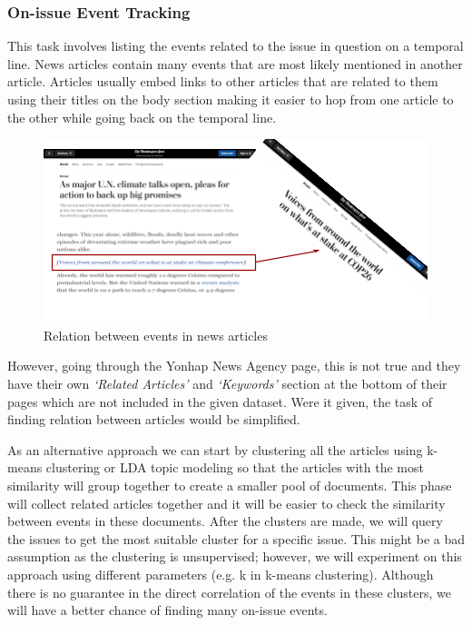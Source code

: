 \documentclass[sigconf,authorversion,nonacm]{acmart}
\begin{document}
\subsubsection{On-issue Event Tracking}
\label{sec:onissue}
This task involves listing the events related to the issue in question on a temporal line. News articles contain many events that are most likely mentioned in another article. Articles usually embed links to other articles that are related to them using their titles on the body section making it easier to hop from one article to the other while going back on the temporal line.

\begin{figure}[h]
    \centering
    \includegraphics[width=\linewidth]{img/rel.png}
    \caption{Relation between events in news articles}
\end{figure}

However, going through the Yonhap News Agency page, this is not true and they have their own \emph{`Related Articles'} and \emph{`Keywords'} section at the bottom of their pages which are not included in the given dataset. Were it given, the task of finding relation between articles would be simplified.

As an alternative approach we can start by clustering all the articles using k-means clustering or LDA topic modeling so that the articles with the most similarity will group together to create a smaller pool of documents. This phase will collect related articles together and it will be easier to check the similarity between events in these documents. After the clusters are made, we will query the issues to get the most suitable cluster for a specific issue. This might be a bad assumption as the clustering is unsupervised; however, we will experiment on this approach using different parameters (e.g. k in k-means clustering). Although there is no guarantee in the direct correlation of the events in these clusters, we will have a better chance of finding many on-issue events.
\end{document}
